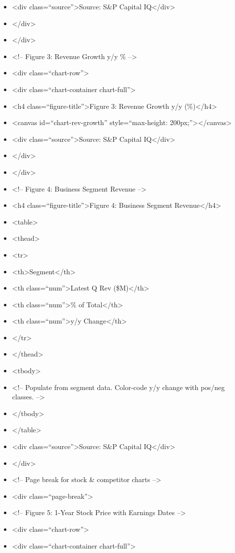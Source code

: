 \documentclass[11pt]{article}
\begin{document}
\begin{itemize}[leftmargin=*,itemsep=2pt,topsep=2pt]
\item {} <div class=``source''>Source: S\&P Capital IQ</div>
\item {} </div>
\item {} </div>
\item {} <!-- Figure 3: Revenue Growth y/y \% -->
\item {} <div class=``chart-row''>
\item {} <div class=``chart-container chart-full''>
\item {} <h4 class=``figure-title''>Figure 3: Revenue Growth y/y (\%)</h4>
\item {} <canvas id=``chart-rev-growth'' style=``max-height: 200px;''></canvas>
\item {} <div class=``source''>Source: S\&P Capital IQ</div>
\item {} </div>
\item {} </div>
\item {} <!-- Figure 4: Business Segment Revenue -->
\item {} <h4 class=``figure-title''>Figure 4: Business Segment Revenue</h4>
\item {} <table>
\item {} <thead>
\item {} <tr>
\item {} <th>Segment</th>
\item {} <th class=``num''>Latest Q Rev (\$M)</th>
\item {} <th class=``num''>\% of Total</th>
\item {} <th class=``num''>y/y Change</th>
\item {} </tr>
\item {} </thead>
\item {} <tbody>
\item {} <!-- Populate from segment data. Color-code y/y change with pos/neg classes. -->
\item {} </tbody>
\item {} </table>
\item {} <div class=``source''>Source: S\&P Capital IQ</div>
\item {} </div>
\item {} <!-- Page break for stock \& competitor charts -->
\item {} <div class=``page-break''>
\item {} <!-- Figure 5: 1-Year Stock Price with Earnings Dates -->
\item {} <div class=``chart-row''>
\item {} <div class=``chart-container chart-full''>

\end{itemize}
\end{document}
